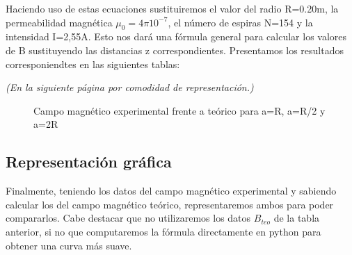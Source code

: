 \documentclass[12pt, a4paper, titlepage]{article}
\begin{document}
  Haciendo uso de estas ecuaciones sustituiremos el valor del radio R=0.20m, la permeabilidad magnética $\mu_0 = 4 \pi 10^{-7}$, el número de espiras N=154 y la intensidad I=2,55A. Esto nos dará una fórmula general para calcular los valores de B sustituyendo las distancias z correspondientes. Presentamos los resultados corresponiendtes en las siguientes tablas:

  \textit{(En la siguiente página por comodidad de representación.)}

  \begin{figure}[H]
    \begin{table}[H]
      \centering
       \quad
       \quad
       \quad
       \quad
    \end{table}
    \caption{Campo magnético experimental frente a teórico para a=R, a=R/2 y a=2R}
  \end{figure}

  \subsection{Representación gráfica}

  Finalmente, teniendo los datos del campo magnético experimental y sabiendo calcular los del campo magnético teórico, representaremos ambos para poder compararlos. Cabe destacar que no utilizaremos los datos $B_{teo}$ de la tabla anterior, si no que computaremos la fórmula directamente en python para obtener una curva más suave.
\end{document}
